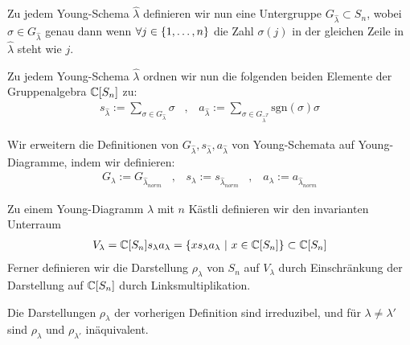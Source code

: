 \begin{definition}
    Zu jedem Young-Schema $\hat{\lambda}$ definieren wir nun eine Untergruppe
    $G_{\hat{\lambda}} \subset S_n$, wobei $\sigma \in G_{\hat{\lambda}}$ genau
    dann wenn $\forall j \in \left\{ 1,\dots,n \right\}$ die Zahl
    $\sigma(j)$ in der gleichen Zeile in $\hat{\lambda}$ steht wie $j$.
\end{definition}

\begin{definition}
    Zu jedem Young-Schema $\hat{\lambda}$ ordnen wir nun die folgenden
    beiden Elemente der Gruppenalgebra $\mathbb{C}[S_n]$ zu:
    \begin{align*}
        s_{\hat{\lambda}} := \sum_{\sigma \in G_{\hat{\lambda}}} \sigma
        \hspace{10pt} , \hspace{10pt}
        a_{\hat{\lambda}} := \sum_{\sigma \in G_{\hat{\lambda}^T}} \text{sgn}(\sigma) \sigma
    \end{align*}
\end{definition}
Wir erweitern die Definitionen von $G_{\hat{\lambda}},s_{\hat{\lambda}},a_{\hat{\lambda}}$
von Young-Schemata auf Young-Diagramme, indem wir definieren:
\begin{align*}
    G_{\lambda} := G_{\hat{\lambda}_{norm}}
    \hspace{10pt} , \hspace{10pt}
    s_\lambda := s_{\hat{\lambda}_{norm}}
    \hspace{10pt} , \hspace{10pt}
    a_{\lambda} := a_{\hat{\lambda}_{norm}}
\end{align*}

\begin{definition}
    Zu einem Young-Diagramm $\lambda$ mit $n$ Kästli definieren wir den
    invarianten Unterraum
    \begin{align*}
        V_{\lambda} = \mathbb{C}[S_n] s_\lambda a_\lambda
        = \left\{  x s_\lambda a_\lambda \ | \ x \in \mathbb{C}[S_n] \right\}
        \subset \mathbb{C}[S_n]
    \end{align*}
    Ferner definieren wir die Darstellung $\rho_\lambda$ von $S_n$ auf
    $V_\lambda$ durch Einschränkung der Darstellung auf $\mathbb{C}[S_n]$ durch
    Linksmultiplikation.
\end{definition}

\begin{satz}
    Die Darstellungen $\rho_\lambda$ der vorherigen Definition sind
    irreduzibel, und für $\lambda \neq \lambda'$ sind $\rho_\lambda$
    und $\rho_{\lambda'}$ inäquivalent.
\end{satz}

